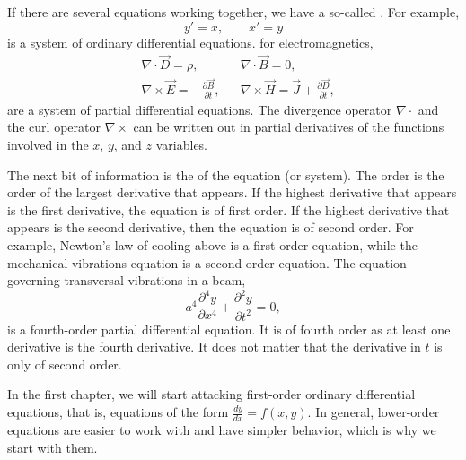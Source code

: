 If there are several equations working together, we have a so-called
\emph{}.  For example,
\begin{equation*}
y' = x , \qquad x' = y
\end{equation*}
is a system of ordinary differential equations.
 for electromagnetics,
\begin{align*}
& \nabla \cdot \vec{D} = \rho, & & \nabla \cdot \vec{B} = 0 , \\
& \nabla \times \vec{E} = - \frac{\partial \vec{B}}{\partial t}, &
& \nabla \times \vec{H} = \vec{J} + \frac{\partial \vec{D}}{\partial t} ,
\end{align*}
are a system of partial differential equations. 
The divergence operator $\nabla \cdot$ and the
curl operator $\nabla \times$ can be written out in partial derivatives of
the functions involved in the $x$, $y$, and $z$ variables.

\medskip

The next bit of information is the \emph{} of the
equation (or system).  The order is the order of the largest
derivative that appears.  If the highest derivative that appears is
the first derivative, the equation is of first order.  If the highest
derivative that appears is the second derivative, then the equation is of second
order.  For example, Newton's law of cooling above is a first-order
equation, while the mechanical vibrations equation is a second-order equation.
The equation governing transversal vibrations in a beam,
\begin{equation*}
a^4 \frac{\partial^4 y}{\partial x^4} + \frac{\partial^2 y}{\partial t^2} = 0,
\end{equation*}
is a fourth-order partial differential equation.  It is of
fourth order as at least one derivative is the fourth derivative.  It
does not matter that the derivative in $t$ is only of second order.

In the first chapter, we will start attacking first-order ordinary
differential equations, that is, equations of the form $\frac{dy}{dx} = f(x,y)$.
In general, lower-order equations are easier to work with and have simpler
behavior, which is why we start with them.

\medskip


